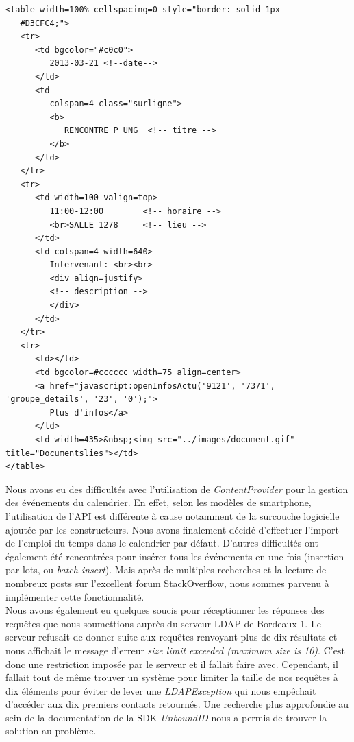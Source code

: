 \begin{adjustbox}{minipage=1.0\textwidth, margin=0pt \smallskipamount, center}
\begin{lstlisting}[style=HTML, label=htmlCode, caption=Exemple d'événement HTML sans contenu (descriptif vide)]
<table width=100% cellspacing=0 style="border: solid 1px 
   #D3CFC4;">
   <tr>
      <td bgcolor="#c0c0">
         2013-03-21 <!--date-->
      </td>
      <td
         colspan=4 class="surligne">
         <b>
            RENCONTRE P UNG  <!-- titre -->
         </b>
      </td>
   </tr>
   <tr>
      <td width=100 valign=top>
         11:00-12:00        <!-- horaire -->
         <br>SALLE 1278     <!-- lieu -->
      </td>
      <td colspan=4 width=640>
         Intervenant: <br><br>
         <div align=justify>
         <!-- description -->
         </div>
      </td>
   </tr>
   <tr>
      <td></td>
      <td bgcolor=#cccccc width=75 align=center>
      <a href="javascript:openInfosActu('9121', '7371', 'groupe_details', '23', '0');">
         Plus d'infos</a>
      </td>
      <td width=435>&nbsp;<img src="../images/document.gif" title="Documentslies"></td>
</table>
\end{lstlisting}
\end{adjustbox}

\wl Nous avons eu des difficultés avec l’utilisation de \emph{ContentProvider} pour la gestion des événements du calendrier. En effet, selon les modèles de smartphone, l’utilisation de l’API est différente à cause notamment de la surcouche logicielle ajoutée par les constructeurs. Nous avons finalement décidé d’effectuer l’import de l’emploi du temps dans le calendrier par défaut. D’autres difficultés ont également été rencontrées pour insérer tous les événements en une fois (insertion par lots, ou \emph{batch insert}). Mais après de multiples recherches et la lecture de nombreux posts sur l’excellent forum StackOverflow, nous sommes parvenu à implémenter cette fonctionnalité. \\

Nous avons également eu quelques soucis pour réceptionner les réponses des requêtes que nous soumettions auprès du serveur LDAP de Bordeaux 1. Le serveur refusait de donner suite aux requêtes renvoyant plus de dix résultats et nous affichait le message d'erreur \textit{size limit exceeded (maximum size is 10)}. C'est donc une restriction imposée par le serveur et il fallait faire avec. Cependant, il fallait tout de même trouver un système pour limiter la taille de nos requêtes à dix éléments pour éviter de lever une \textit{LDAPException} qui nous empêchait d'accéder aux dix premiers contacts retournés. Une recherche plus approfondie au sein de la documentation de la SDK \textit{UnboundID} nous a permis de trouver la solution au problème. \\ 

